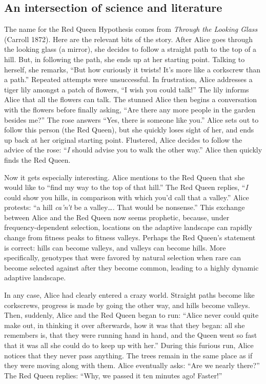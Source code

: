 \documentclass[
  letterpaper,
]{book}
\begin{document}
\hypertarget{an-intersection-of-science-and-literature}{%
\subsection{An intersection of science and
literature}\label{an-intersection-of-science-and-literature}}

The name for the Red Queen Hypothesis comes from \emph{Through the
Looking Glass} (Carroll 1872). Here are the relevant bits of the story.
After Alice goes through the looking glass (a mirror), she decides to
follow a straight path to the top of a hill. But, in following the path,
she ends up at her starting point. Talking to herself, she remarks,
``But how curiously it twists! It's more like a corkscrew than a path.''
Repeated attempts were unsuccessful. In frustration, Alice addresses a
tiger lily amongst a patch of flowers, ``I wish you could talk!'' The
lily informs Alice that all the flowers can talk. The stunned Alice then
begins a conversation with the flowers before finally asking, ``Are
there any more people in the garden besides me?'' The rose answers
``Yes, there is someone like you.'' Alice sets out to follow this person
(the Red Queen), but she quickly loses sight of her, and ends up back at
her original starting point. Flustered, Alice decides to follow the
advice of the rose: ``\emph{I} should advise you to walk the other
way.'' Alice then quickly finds the Red Queen.

Now it gets especially interesting. Alice mentions to the Red Queen that
she would like to ``find my way to the top of that hill.'' The Red Queen
replies, ``\emph{I} could show you hills, in comparison with which you'd
call that a valley.'' Alice protests: ``a hill \emph{ca'n't} be a
valley\ldots. That would be nonsense.'' This exchange between Alice and
the Red Queen now seems prophetic, because, under frequency-dependent
selection, locations on the adaptive landscape can rapidly change from
fitness peaks to fitness valleys. Perhaps the Red Queen's statement is
correct: hills can become valleys, and valleys can become hills. More
specifically, genotypes that were favored by natural selection when rare
can become selected against after they become common, leading to a
highly dynamic adaptive landscape.

In any case, Alice had clearly entered a crazy world. Straight paths
become like corkscrews, progress is made by going the other way, and
hills become valleys. Then, suddenly, Alice and the Red Queen began to
run: ``Alice never could quite make out, in thinking it over afterwards,
how it was that they began: all she remembers is, that they were running
hand in hand, and the Queen went so fast that it was all she could do to
keep up with her.'' During this furious run, Alice notices that they
never pass anything. The trees remain in the same place as if they were
moving along with them. Alice eventually asks: ``Are we nearly there?''
The Red Queen replies: ``Why, we passed it ten minutes ago! Faster!''
\end{document}
